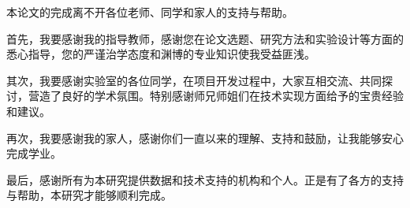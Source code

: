 本论文的完成离不开各位老师、同学和家人的支持与帮助。

首先，我要感谢我的指导教师，感谢您在论文选题、研究方法和实验设计等方面的悉心指导，您的严谨治学态度和渊博的专业知识使我受益匪浅。

其次，我要感谢实验室的各位同学，在项目开发过程中，大家互相交流、共同探讨，营造了良好的学术氛围。特别感谢师兄师姐们在技术实现方面给予的宝贵经验和建议。

再次，我要感谢我的家人，感谢你们一直以来的理解、支持和鼓励，让我能够安心完成学业。

最后，感谢所有为本研究提供数据和技术支持的机构和个人。正是有了各方的支持与帮助，本研究才能够顺利完成。